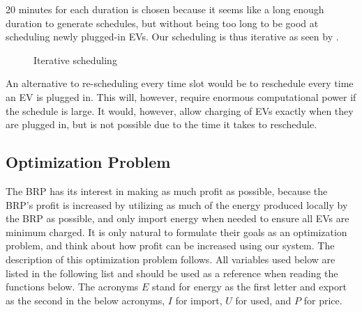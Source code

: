 20 minutes for each duration is chosen because it seems like a long enough duration to generate schedules, but without being too long to be good at scheduling newly plugged-in EVs. Our scheduling is thus iterative as seen by .

\begin{figure}[!htb]
  \centering
  
  \caption{Iterative scheduling}\label{fig:schedspiral}
\end{figure}

An alternative to re-scheduling every time slot would be to reschedule every time an EV is plugged in. This will, however, require enormous computational power if the schedule is large. It would, however, allow charging of EVs exactly when they are plugged in, but is not possible due to the time it takes to reschedule. 

\subsection{Optimization Problem} \label{sec:optimizationProblem}
The BRP has its interest in making as much profit as possible, because the BRP's profit is increased by utilizing as much of the energy produced locally by the BRP as possible, and only import energy when needed to ensure all EVs are minimum charged. It is only natural to formulate their goals as an optimization problem, and think about how profit can be increased using our system. The description of this optimization problem follows. All variables used below are listed in the following list and should be used as a reference when reading the functions below. The acronyms $E$ stand for energy as the first letter and export as the second in the below acronyms, $I$ for import, $U$ for used, and $P$ for price.

